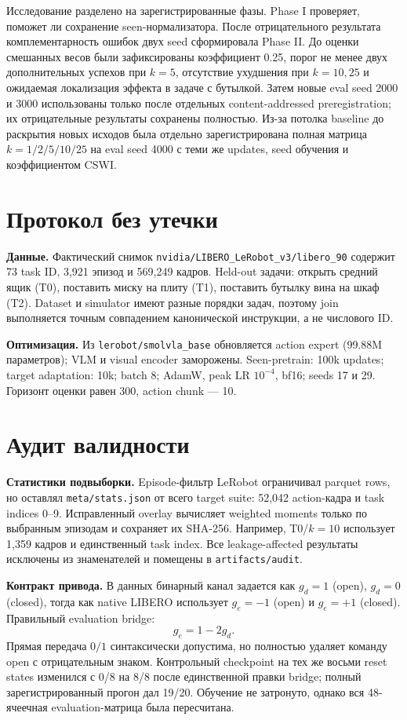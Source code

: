 \documentclass[10pt,twocolumn]{article}
\newcommand{\code}[1]{\texttt{#1}}
\begin{document}
Исследование разделено на зарегистрированные фазы. Phase I проверяет, поможет ли сохранение
seen-нормализатора. После отрицательного результата комплементарность ошибок двух seed сформировала
Phase II. До оценки смешанных весов были зафиксированы коэффициент 0.25, порог не менее двух
дополнительных успехов при $k=5$, отсутствие ухудшения при $k=10,25$ и ожидаемая локализация эффекта
в задаче с бутылкой. Затем новые eval seed 2000 и 3000 использованы только после отдельных
content-addressed preregistration; их отрицательные результаты сохранены полностью. Из-за потолка
baseline до раскрытия новых исходов была отдельно зарегистрирована полная матрица $k=1/2/5/10/25$
на eval seed 4000 с теми же updates, seed обучения и коэффициентом CSWI.

\section{Протокол без утечки}

\textbf{Данные.} Фактический снимок \code{nvidia/LIBERO\_LeRobot\_v3/libero\_90} содержит 73 task ID,
3,921 эпизод и 569,249 кадров. Held-out задачи: открыть средний ящик (T0), поставить миску на плиту
(T1), поставить бутылку вина на шкаф (T2). Dataset и simulator имеют разные порядки задач, поэтому
join выполняется точным совпадением канонической инструкции, а не числового ID.

\textbf{Оптимизация.} Из \code{lerobot/smolvla\_base} обновляется action expert (99.88M параметров);
VLM и visual encoder заморожены. Seen-pretrain: 100k updates; target adaptation: 10k; batch 8;
AdamW, peak LR $10^{-4}$, bf16; seeds 17 и 29. Горизонт оценки равен 300, action chunk --- 10.

\newpage
\section{Аудит валидности}

\textbf{Статистики подвыборки.} Episode-фильтр LeRobot ограничивал parquet rows, но оставлял
\code{meta/stats.json} от всего target suite: 52,042 action-кадра и task indices 0--9. Исправленный
overlay вычисляет weighted moments только по выбранным эпизодам и сохраняет их SHA-256. Например,
T0/$k=10$ использует 1,359 кадров и единственный task index. Все leakage-affected результаты
исключены из знаменателей и помещены в \code{artifacts/audit}.

\textbf{Контракт привода.} В данных бинарный канал задается как
$g_d=1$ (open), $g_d=0$ (closed), тогда как native LIBERO использует $g_e=-1$ (open) и $g_e=+1$
(closed). Правильный evaluation bridge:
\[
g_e=1-2g_d.
\]
Прямая передача $0/1$ синтаксически допустима, но полностью удаляет команду open с отрицательным
знаком. Контрольный checkpoint на тех же восьми reset states изменился с 0/8 на 8/8 после единственной
правки bridge; полный зарегистрированный прогон дал 19/20. Обучение не затронуто, однако вся
48-ячеечная evaluation-матрица была пересчитана.
\end{document}
